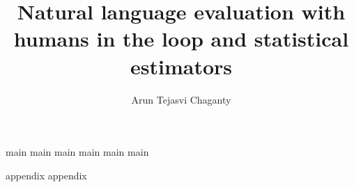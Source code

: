 \documentclass[12pt]{report}
\begin{document}
\title{Natural language evaluation with humans in the loop and statistical estimators}
\author{Arun Tejasvi Chaganty}
 
\beforepreface{}


\afterpreface{}

{main}
{main}
{main}
{main}
{main}
{main}

\appendix
{appendix}
{appendix}

%


\end{document}
